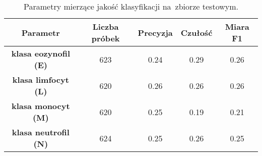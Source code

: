 {\begin{itemize}
\begin{table}[t]
\centering
\caption[Short Heading]{Parametry mierzące jakość klasyfikacji na~zbiorze testowym.}
\label{tab:kaggle_3_params_val}
\begin{tabular}{|c|c|c|c|c|}
\hline
\textbf{Parametr}                               & \textbf{Liczba próbek} & \textbf{Precyzja} & \textbf{Czułość} & \textbf{Miara F1} \\ \hline
\textbf{klasa eozynofil (E)} & 623 & 0.24   & 0.29   & 0.26  \\ \hline
\textbf{klasa limfocyt (L)}  & 620 & 0.26  & 0.26 & 0.26  \\ \hline
\textbf{klasa monocyt (M)}  & 620 & 0.25   & 0.19    & 0.21  \\ \hline
\textbf{klasa neutrofil (N)}  & 624 & 0.25   & 0.26    & 0.25  \\ \hline
\end{tabular}
\end{table}

\end{itemize}
}
